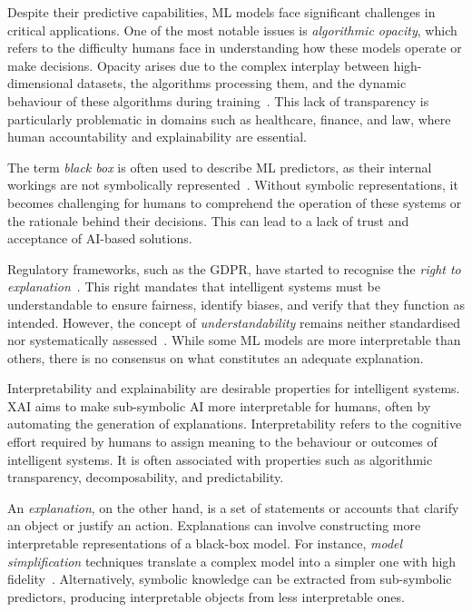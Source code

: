 Despite their predictive capabilities, \gls{ML} models face significant challenges in critical applications.
%
One of the most notable issues is \emph{algorithmic opacity}, which refers to the difficulty humans face in understanding how these models operate or make decisions.
%
Opacity arises due to the complex interplay between high-dimensional datasets, the algorithms processing them, and the dynamic behaviour of these algorithms during training~\cite{DBLP:journals/bigdatasociety/Burrell16}.
%
This lack of transparency is particularly problematic in domains such as healthcare, finance, and law, where human accountability and explainability are essential.


The term \emph{black box} is often used to describe \gls{ML} predictors, as their internal workings are not symbolically represented~\cite{interpretability-lipton-2018}.
%
Without symbolic representations, it becomes challenging for humans to comprehend the operation of these systems or the rationale behind their decisions.
%
This can lead to a lack of trust and acceptance of \gls{AI}-based solutions.


Regulatory frameworks, such as the \gls{GDPR}, have started to recognise the \emph{right to explanation}~\cite{DBLP:journals/aim/GoodmanF17}.
%
This right mandates that intelligent systems must be understandable to ensure fairness, identify biases, and verify that they function as intended.
%
However, the concept of \emph{understandability} remains neither standardised nor systematically assessed~\cite{DBLP:journals/ai/Miller19}.
%
While some \gls{ML} models are more interpretable than others, there is no consensus on what constitutes an adequate explanation.


Interpretability and explainability are desirable properties for intelligent systems.
%
\Gls{XAI} aims to make sub-symbolic \gls{AI} more interpretable for humans, often by automating the generation of explanations.
%
Interpretability refers to the cognitive effort required by humans to assign meaning to the behaviour or outcomes of intelligent systems.
%
It is often associated with properties such as algorithmic transparency, decomposability, and predictability.


An \emph{explanation}, on the other hand, is a set of statements or accounts that clarify an object or justify an action.
%
Explanations can involve constructing more interpretable representations of a black-box model.
%
For instance, \emph{model simplification} techniques translate a complex model into a simpler one with high fidelity~\cite{DBLP:conf/kdd/TolomeiSHL17,DBLP:journals/csur/GuidottiMRTGP19}.
%
Alternatively, symbolic knowledge can be extracted from sub-symbolic predictors, producing interpretable objects from less interpretable ones.


